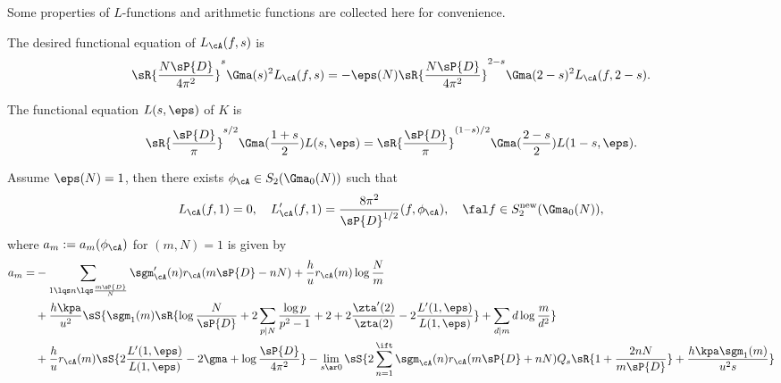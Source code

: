 \documentclass[article, a4paper, twoside]{universal}
\begin{document}

\begin{rcl}
Some properties of $L$-functions and arithmetic functions are collected here for convenience.

The desired functional equation of $L_{\cA}(f,s)$ is
\[
	\sR{\frac{N\sP{D}}{4\pi^{2}}}^{s}\Gma(s)^{2}L_{\cA}(f,s)=-\eps(N)\sR{\frac{N\sP{D}}{4\pi^{2}}}^{2-s}\Gma(2-s)^{2}L_{\cA}(f,2-s).
\]

The functional equation $L(s,\eps)$ of $K$ is
\[
	\sR{\frac{\sP{D}}{\pi}}^{s/2}\Gma(\frac{1+s}{2})L(s,\eps)=\sR{\frac{\sP{D}}{\pi}}^{(1-s)/2}\Gma(\frac{2-s}{2})L(1-s,\eps).
\]

\end{rcl}

\begin{thm}[{\cite[IV.6.9]{GZ1986}}]\label{thm:cform}
	Assume $\eps(N)=1$, then there exists $\phi_{\cA}\in S_{2}(\Gma_{0}(N))$ such that
	\[
		L_{\cA}(f,1)=0,\quad L_{\cA}'(f,1)=\frac{8\pi^{2}}{\sP{D}^{1/2}}(f,\phi_{\cA}),\quad \fal f\in S_{2}^{\mathrm{new}}(\Gma_{0}(N)),
	\]
	where $a_{m}:=a_{m}(\phi_{\cA})$ for $(m,N)=1$ is given by
	\begin{align*}
	  a_{m} = &-\sum_{1\lqs n\lqs \frac{m\sP{D}}{N}}\sgm_{\cA}'(n)r_{\cA}(m\sP{D}-nN)+\frac{h}{u}r_{\cA}(m)\log\frac{N}{m} \\
			  &+\frac{h\kpa}{u^{2}}\sS{\sgm_{1}(m)\sR{\log\frac{N}{\sP{D}}+2\sum_{p\mid N}\frac{\log p}{p^{2}-1}+2+2\frac{\zta'(2)}{\zta(2)}-2\frac{L'(1,\eps)}{L(1,\eps)}}+\sum_{d\mid m}d\log\frac{m}{d^{2}}} \\
			  &+\frac{h}{u}r_{\cA}(m)\sS{2\frac{L'(1,\eps)}{L(1,\eps)}-2\gma+\log\frac{\sP{D}}{4\pi^{2}}}-\lim_{s\ar0}\sS{2\sum_{n=1}^{\ift}\sgm_{\cA}(n)r_{\cA}(m\sP{D}+nN)Q_{s}\sR{1+\frac{2nN}{m\sP{D}}}+\frac{h\kpa\sgm_{1}(m)}{u^{2}s}}
	\end{align*}
\end{thm}
\end{document}
